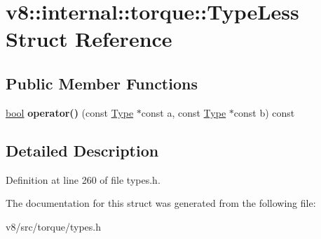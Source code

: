 \hypertarget{structv8_1_1internal_1_1torque_1_1TypeLess}{}\section{v8\+:\+:internal\+:\+:torque\+:\+:Type\+Less Struct Reference}
\label{structv8_1_1internal_1_1torque_1_1TypeLess}
\subsection*{Public Member Functions}
\begin{DoxyCompactItemize}
\item 
\mbox{\label{structv8_1_1internal_1_1torque_1_1TypeLess_a631b9bff6a1b8906aed1271f3d53b097}} 
\mbox{\hyperlink{classbool}{bool}} {\bfseries operator()} (const \mbox{\hyperlink{classv8_1_1internal_1_1torque_1_1Type}{Type}} $\ast$const a, const \mbox{\hyperlink{classv8_1_1internal_1_1torque_1_1Type}{Type}} $\ast$const b) const
\end{DoxyCompactItemize}


\subsection{Detailed Description}


Definition at line 260 of file types.\+h.



The documentation for this struct was generated from the following file\+:\begin{DoxyCompactItemize}
\item 
v8/src/torque/types.\+h\end{DoxyCompactItemize}
